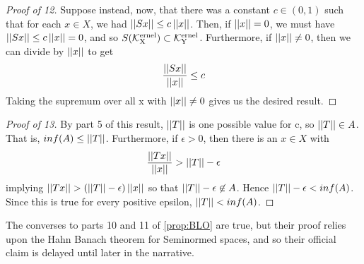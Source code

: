 \begin{prop}
\begin{proof}[Proof of 12]
	Suppose instead, now, that there was a constant $c \in (0,1)$ such that 
	for each $x \in X$, we had $\left|\left| Sx \right|\right| \leq c\left|\left| x \right|\right|$. 
	Then, if $\left|\left| x \right|\right| = 0$, we must have 
	$\left|\left| Sx \right|\right| \leq c \left|\left| x \right|\right| =0$, and so 
	$S(\bf\mathcal{K}\rm^{ernel}_X) \subset \bf\mathcal{K}\rm^{ernel}_Y$. 
	Furthermore, if $\left|\left| x \right|\right| \neq 0$, then we can 
	divide by $\left|\left| x \right|\right|$ to get 
	\begin{equation}
	\frac{\left|\left| Sx \right|\right|}{\left|\left| x \right|\right|} \leq c
	\end{equation}
	Taking the supremum over all x with $\left|\left| x \right|\right| \neq 0$ gives us the desired result. 
\end{proof}
\begin{proof}[Proof of 13]
	By part 5 of this result, $\left|\left| T \right|\right|$ is one possible value
	for c, so $\left|\left| T \right|\right| \in A$. 
	That is, $inf(A) \leq \left|\left| T \right|\right|$. 
	Furthermore, if $\epsilon > 0$, then there
	is an $x \in X$ with 
	\begin{equation}
	\frac{\left|\left| Tx \right|\right|}{\left|\left| x \right|\right|} > \left|\left| T \right|\right|-\epsilon
	\end{equation}
	implying $\left|\left| Tx \right|\right| > (\left|\left| T \right|\right|-\epsilon) \left|\left| x \right|\right|$ so that
	$\left|\left| T \right|\right| - \epsilon \not \in A$. 
	Hence $\left|\left| T \right|\right| - \epsilon < inf(A)$. 
	Since this is true for every positive epsilon, 
	$\left|\left| T \right|\right| < inf(A)$. 
\end{proof}
\end{prop}


\begin{rmk}[Converses]
The converses to parts 10 and 11 of 
\ref{prop:BLO} 
are true, but their proof relies upon
the Hahn Banach theorem for Seminormed spaces, 
and so their official claim
is delayed until later in the narrative. 
\end{rmk}


